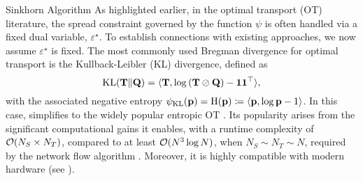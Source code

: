 \begin{mem1}{Sinkhorn Algorithm}\label{mem:sinkhorn}
    As highlighted earlier, in the optimal transport (OT) literature, the spread constraint governed by the function $\psi$ is often handled via a fixed dual variable, $\varepsilon^\star$. To establish connections with existing approaches, we now assume $\varepsilon^\star$ is fixed. The most commonly used Bregman divergence for optimal transport is the Kullback-Leibler (KL) divergence, defined as
    \[
    \operatorname{KL}({\mathbf{T}} \| {\mathbf{Q}}) = \langle {\mathbf{T}}, \log \left( {\mathbf{T}} \oslash {\mathbf{Q}} \right) - \bm{1} \bm{1}^\top \rangle,
    \]
    with the associated negative entropy $\psi_{\operatorname{KL}}(\mathbf{p}) = \operatorname{H}({\mathbf{p}}) \coloneqq \langle \mathbf{p}, \log \mathbf{p} - 1 \rangle$.
    In this case,  simplifies to the widely popular entropic OT \citep{cuturi2013sinkhorn}. Its popularity arises from the significant computational gains it enables, with a runtime complexity of ${\mathcal{O}}(N_S \times N_T)$, compared to at least ${\mathcal{O}}(N^3 \log N)$, when $N_S \sim N_T \sim N$, required by the network flow algorithm \citep{peyre2019computational}. Moreover, it is highly compatible with modern hardware (see ).
    

\end{mem1}

